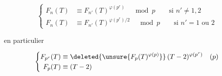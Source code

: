 \[
\left\{\begin{aligned}
F_n(T)&\equiv F_{n'}(T)^{\varphi(p^r)}\quad\bmod p\qquad\text{si }n'\ne1,2\\
F_n(T)&\equiv F_{n'}(T)^{\varphi(p^r)/2}\quad\bmod p\qquad\text{si }n'=1\text{ ou }2
\end{aligned}\right.
\]

en particulier

\[
\left\{\begin{aligned}
F_{p^r}(T)&\equiv\deleted{\unsure{F_p(T)^{\varphi(p)}}}\,(T-2)^{\varphi(p^r)}\quad(p)\\
F_p(T)&\equiv(T-2)
\end{aligned}\right.
\]

